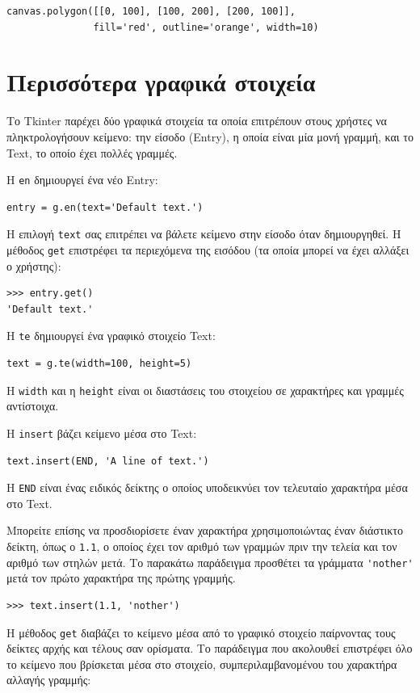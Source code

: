 \documentclass[10pt]{book}
\begin{document}
\begin{verbatim}
canvas.polygon([[0, 100], [100, 200], [200, 100]],
               fill='red', outline='orange', width=10)
\end{verbatim}
%


 
\section{Περισσότερα γραφικά στοιχεία}

Το Tkinter παρέχει δύο γραφικά στοιχεία τα οποία επιτρέπουν στους χρήστες να 
πληκτρολογήσουν κείμενο: την είσοδο (Entry), η οποία είναι μία μονή γραμμή, 
και το Text, το οποίο έχει πολλές γραμμές.

Η {\tt en} δημιουργεί ένα νέο Entry:

\begin{verbatim}
entry = g.en(text='Default text.')
\end{verbatim}
%
Η επιλογή {\tt text} σας επιτρέπει να βάλετε κείμενο στην είσοδο όταν δημιουργηθεί.
Η μέθοδος {\tt get} επιστρέφει τα περιεχόμενα της εισόδου (τα οποία μπορεί να έχει αλλάξει ο χρήστης):

\begin{verbatim}
>>> entry.get()
'Default text.'
\end{verbatim}
%
Η {\tt te} δημιουργεί ένα γραφικό στοιχείο Text:

\begin{verbatim}
text = g.te(width=100, height=5)
\end{verbatim}
%
Η {\tt width} και η {\tt height} είναι οι διαστάσεις του στοιχείου σε
χαρακτήρες και γραμμές αντίστοιχα.

Η {\tt insert} βάζει κείμενο μέσα στο Text:

\begin{verbatim}
text.insert(END, 'A line of text.')
\end{verbatim}
%
Η {\tt END} είναι ένας ειδικός δείκτης ο οποίος υποδεικνύει τον τελευταίο 
χαρακτήρα μέσα στο Text.

Μπορείτε επίσης να προσδιορίσετε έναν χαρακτήρα χρησιμοποιώντας έναν διάστικτο δείκτη, 
όπως ο {\tt 1.1}, ο οποίος έχει τον αριθμό των γραμμών πριν την τελεία και τον 
αριθμό των στηλών μετά.  Το παρακάτω παράδειγμα προσθέτει τα γράμματα \verb"'nother'"  
μετά τον πρώτο χαρακτήρα της πρώτης γραμμής. 

\begin{verbatim}
>>> text.insert(1.1, 'nother')
\end{verbatim}
%
Η μέθοδος {\tt get} διαβάζει το κείμενο μέσα από το γραφικό στοιχείο παίρνοντας τους δείκτες
αρχής και τέλους σαν ορίσματα.  Το παράδειγμα που ακολουθεί επιστρέφει όλο το
κείμενο που βρίσκεται μέσα στο στοιχείο, συμπεριλαμβανομένου του χαρακτήρα αλλαγής γραμμής:
\end{document}
